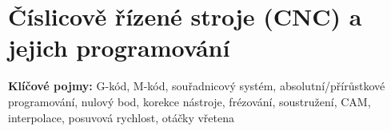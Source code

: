\documentclass[a4paper,10pt]{article}
\begin{document}


\newpage

\section{Číslicově řízené stroje (CNC) a jejich programování}

\begin{pojmybox}
\textbf{Klíčové pojmy:}
G-kód, M-kód, souřadnicový systém, absolutní/přírůstkové programování,
nulový bod, korekce nástroje, frézování, soustružení, CAM,
interpolace, posuvová rychlost, otáčky vřetena
\end{pojmybox}
\end{document}
